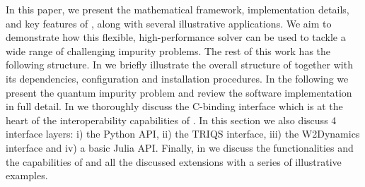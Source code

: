 \documentclass[edipack_sp.tex]{subfiles}
\begin{document}
In this paper, we present the mathematical framework, implementation
details, and key features of \NAME, along with several illustrative
applications. We aim to demonstrate how this flexible,
high-performance solver can be used to tackle a wide range of
challenging impurity problems. 
The rest of this work has the following structure. In  we 
briefly illustrate the overall structure of \NAME together with its dependencies, configuration
and installation procedures. In the following   we present the quantum impurity
problem and review the software implementation in full detail. In  we thoroughly discuss the C-binding interface which is at the heart of the 
interoperability capabilities of \NAME. In this section we also discuss 4 interface layers: i) 
the Python API, ii) the TRIQS interface, iii) the W2Dynamics interface and iv) a basic Julia API.
Finally, in  we discuss the functionalities and the capabilities of \NAME and 
all the discussed extensions with a series of illustrative examples. 

\ifSubfilesClassLoaded{
  
}{}
\end{document}
